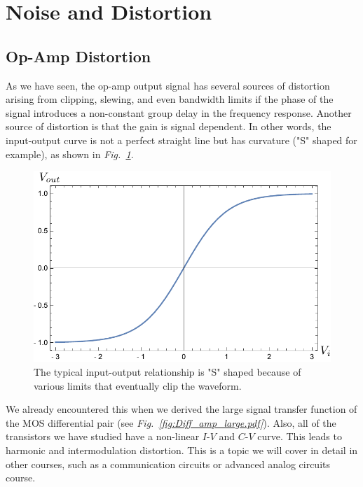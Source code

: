 \section{Noise and Distortion}
\subsection{Op-Amp Distortion}
As we have seen, the op-amp output signal has several sources of distortion arising from clipping, slewing, and even bandwidth limits if the phase of the signal introduces a non-constant group delay in the frequency response.  Another source of distortion is that the gain is signal dependent.  In other words, the input-output curve is not a perfect straight line but has curvature ("S" shaped for example), as shown in \emph{Fig.~\ref{fig:vtanh}}.
\begin{figure}[H]
\centering
\includegraphics[width=.5\columnwidth]{vtanh}
\caption{The typical input-output relationship is "S" shaped because of various limits that eventually clip the waveform.}
\label{fig:vtanh}
\end{figure}
\newpage
We already encountered this when we derived the large signal transfer function of the MOS differential pair (see \emph{Fig.~\ref{fig:Diff_amp_large.pdf}}). Also, all of the transistors we have studied have a non-linear $I$-$V$ and $C$-$V$ curve.  This leads to harmonic and intermodulation distortion.  This is a topic we will cover in detail in other courses, such as a communication circuits or advanced analog circuits course.

